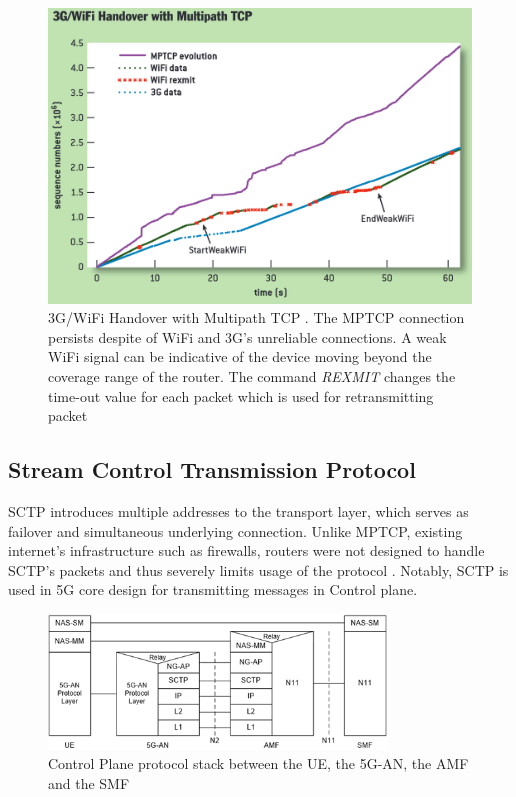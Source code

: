 \begin{figure}[H]
	\centering
	\includegraphics[width=1.0\textwidth]{resources/images/3G_WiFi_Handover_with_Multipath_TCP.PNG}
	\caption{3G/WiFi Handover with Multipath TCP \cite{paasch_multipath_2014}. The \ac{MPTCP} connection persists despite of WiFi and 3G's unreliable connections. A weak WiFi signal can be indicative of the device moving beyond the coverage range of the router. The command \textit{REXMIT} changes the time-out value for each packet which is used for retransmitting packet}
    \label{fig:related_work:3G_WiFi_Handover_with_Multipath_TCP}
\end{figure}

\subsection{Stream Control Transmission Protocol}
\ac{SCTP} introduces multiple addresses to the transport layer, which serves as failover and simultaneous underlying connection.
Unlike \ac{MPTCP}, existing internet's infrastructure such as firewalls, routers were not designed to handle \ac{SCTP}'s packets and thus severely limits usage of the protocol \cite{paasch_multipath_2014}. 
Notably, \ac{SCTP} is used in 5G core design for transmitting messages in Control plane.

\begin{figure}[H]
	\centering
	\includegraphics[width=0.8\textwidth]{resources/images/3gpp_5g_part_of_control_plane_protocol.png}
	\caption{Control Plane protocol stack between the UE, the 5G-AN, the AMF and the SMF \cite{3gpp_5g_system_overview}}
    \label{fig:related_work:3gpp_5g_part_of_control_plane_protocol}
\end{figure}

